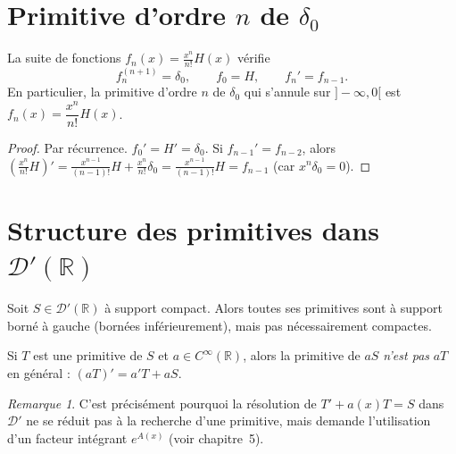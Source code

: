 \documentclass[12pt,a4paper,openany]{book}
\theoremstyle{definition}
\theoremstyle{plain}
\theoremstyle{remark}
\newtheorem*{remark}{Remarque}
\newenvironment{remarque}{\begin{remark}}{\end{remark}}
\begin{document}
	\section{Primitive d'ordre \texorpdfstring{$n$}{n} de \texorpdfstring{$\delta_0$}{delta}}
	
	\begin{proposition}
		La suite de fonctions $\displaystyle f_n(x) = \frac{x^n}{n!}H(x)$ vérifie
		\[
		f_n^{(n+1)} = \delta_0, \qquad f_0 = H, \qquad f_n' = f_{n-1}.
		\]
		En particulier, la primitive d'ordre $n$ de $\delta_0$ qui s'annule sur $]-\infty,0[$ est $f_n(x) = \dfrac{x^n}{n!}H(x)$.
	\end{proposition}
	
	\begin{proof}
		Par récurrence. $f_0' = H' = \delta_0$. Si $f_{n-1}' = f_{n-2}$, alors
		$\left(\frac{x^n}{n!}H\right)' = \frac{x^{n-1}}{(n-1)!}H + \frac{x^n}{n!}\delta_0 = \frac{x^{n-1}}{(n-1)!}H = f_{n-1}$
		(car $x^n\delta_0 = 0$).
	\end{proof}
	
	\section{Structure des primitives dans \texorpdfstring{$\mathcal{D}'(\mathbb{R})$}{D'(R)}}
	
	\begin{proposition}
		Soit $S \in \mathcal{D}'(\mathbb{R})$ à support compact. Alors toutes ses primitives sont à support borné à gauche (bornées inférieurement), mais pas nécessairement compactes.
	\end{proposition}
	
	\begin{proposition}
		Si $T$ est une primitive de $S$ et $a \in C^\infty(\mathbb{R})$, alors la primitive de $aS$ \emph{n'est pas} $aT$ en général : $(aT)' = a'T + aS$.
	\end{proposition}
	
	\begin{remarque}
		C'est précisément pourquoi la résolution de $T' + a(x)T = S$ dans $\mathcal{D}'$ ne se réduit pas à la recherche d'une primitive, mais demande l'utilisation d'un facteur intégrant $e^{A(x)}$ (voir chapitre~5).
	\end{remarque}
	
\end{document}
